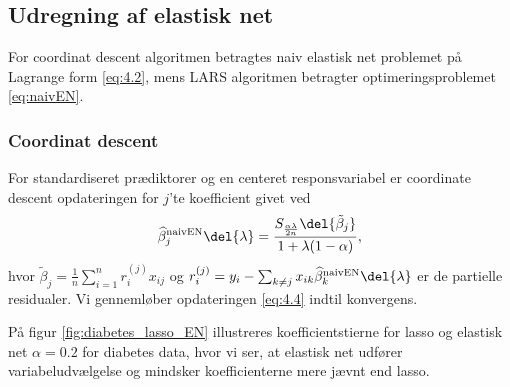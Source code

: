 %
\subsection{Udregning af elastisk net}
For coordinat descent algoritmen betragtes naiv elastisk net problemet på Lagrange form \eqref{eq:4.2}, mens LARS algoritmen betragter optimeringsproblemet \eqref{eq:naivEN}.
%
\subsubsection{Coordinat descent}
For standardiseret prædiktorer og en centeret responsvariabel er coordinate descent opdateringen for $j$'te koefficient givet ved
\begin{align}
\widehat{\beta}^\text{naivEN}_j \del{\lambda}= \frac{S_{\frac{\alpha \lambda}{2n}} \del{\tilde{\beta}_j}}{1 + \lambda (1-\alpha)}, \label{eq:4.4}
\end{align}
hvor \(\tilde{\beta}_j = \frac{1}{n} \sum_{i=1}^n r_{i}^{(j)} x_{ij}\) og \(r_{i}^{(j)} = y_i - \sum_{k \neq j} x_{ik} \widehat{\beta}^\text{naivEN}_k \del{\lambda}\) er de partielle residualer.
Vi gennemløber opdateringen \eqref{eq:4.4} indtil konvergens.

\begin{eks}
På figur \ref{fig:diabetes_lasso_EN} illustreres koefficientstierne for lasso og elastisk net \(\alpha = 0.2\) for diabetes data, hvor vi ser, at elastisk net udfører variabeludvælgelse og mindsker koefficienterne mere jævnt end lasso.

\end{eks}

